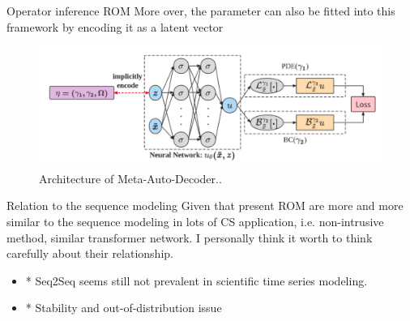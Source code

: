 \documentclass{beamer}
\begin{document}
\begin{frame}{Operator inference ROM}
	More over, the parameter can also be fitted into this framework by encoding it as a latent vector\footnotemark
	\begin{figure}[ht]
		\centering
		\centerline{\includegraphics[width=\linewidth]{fig/MAD.png}}
		\caption{
		Architecture of Meta-Auto-Decoder..\footnotemark}
\end{figure}
\end{frame}

\begin{frame}{Relation to the sequence modeling}
	Given that present ROM are more and more similar to the sequence modeling in lots of CS application, i.e.
	non-intrusive method, similar transformer network. I personally think it worth to think carefully about their
	relationship.
	\begin{itemize}
		\item * Seq2Seq seems still not prevalent in scientific time series modeling.
		\item * Stability and out-of-distribution issue
	\end{itemize}
\end{frame}
\end{document}
